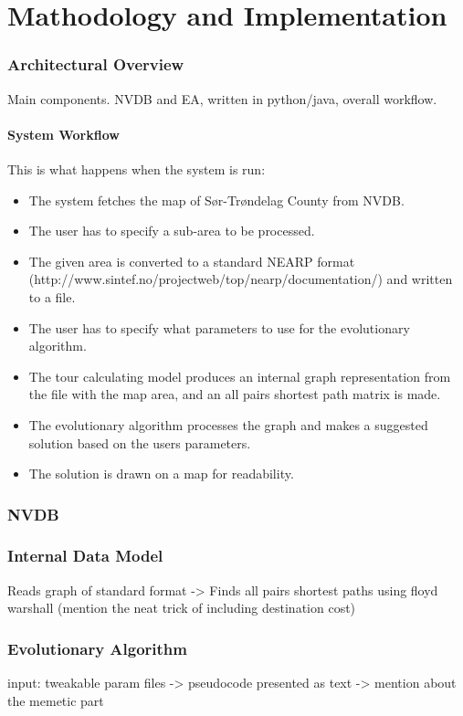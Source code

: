 \chapter{Mathodology and Implementation}

\subsection{Architectural Overview}
Main components. NVDB and EA, written in python/java, overall workflow.

\subsubsection{System Workflow}
This is what happens when the system is run:

\begin{itemize}
	\item The system fetches the map of Sør-Trøndelag County from NVDB.
	\item The user has to specify a sub-area to be processed.
	\item The given area is converted to a standard NEARP format (http://www.sintef.no/projectweb/top/nearp/documentation/) and written to a file.
	\item The user has to specify what parameters to use for the evolutionary algorithm.
	\item The tour calculating model produces an internal graph representation from the file with the map area, and an all pairs shortest path matrix is made.
	\item The evolutionary algorithm processes the graph and makes a suggested solution based on the users parameters.
	\item The solution is drawn on a map for readability.
\end{itemize}

\subsection{NVDB}

\subsection{Internal Data Model}
Reads graph of standard format -> Finds all pairs shortest paths using floyd warshall (mention the neat trick of including destination cost)

\subsection{Evolutionary Algorithm}
input: tweakable param files -> pseudocode presented as text -> mention about the memetic part


